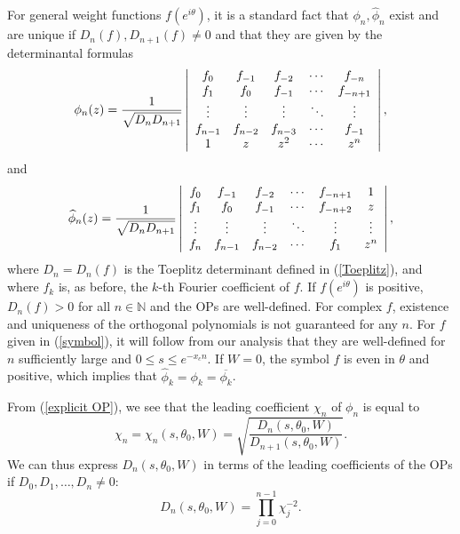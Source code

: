 \documentclass[11pt,fleqn]{article}
\numberwithin{equation}{section}
\begin{document}
For general weight functions $f(e^{i\theta})$, it is a standard fact that $\phi_n,\widehat\phi_n$ exist and are unique if $D_n(f), D_{n+1}(f)\neq 0$ and that they are given by the determinantal formulas \cite{Simon}
\begin{equation} \label{explicit OP}
\phi_{n}(z) = \frac{1}{\sqrt{D_{n}D_{n+1}}} \left| \begin{array}{c c c c c}
f_0 & f_{-1} & f_{-2} & \cdots & f_{-n} \\
f_{1} & f_{0} & f_{-1} & \cdots & f_{-n+1} \\
\vdots & \vdots & \vdots & \ddots & \vdots \\
f_{n-1} & f_{n-2} & f_{n-3} & \cdots & f_{-1} \\
1 & z & z^2 & \cdots & z^n
\end{array} \right|,
\end{equation}
and
\begin{equation} \label{explicit OP2}
\widehat\phi_{n}(z) = \frac{1}{\sqrt{D_{n}D_{n+1}}} \left| \begin{array}{c c c c c c}
f_0 & f_{-1} & f_{-2} & \cdots & f_{-n+1} &1\\
f_{1} & f_{0} & f_{-1} & \cdots & f_{-n+2}& z\\
\vdots & \vdots & \vdots & \ddots & \vdots& \vdots\\
f_{n} & f_{n-1} & f_{n-2} & \cdots & f_{1}& z^{n}
\end{array} \right|,
\end{equation}
where $D_n=D_n(f)$ is the Toeplitz determinant defined in (\ref{Toeplitz}), and where $f_k$ is, as before, the $k$-th Fourier coefficient of $f$.
If $f(e^{i\theta})$ is  positive, $D_n(f)>0$ for all $n\in\mathbb N$ and the OPs are well-defined. 
For complex $f$, existence and uniqueness of the orthogonal polynomials is not guaranteed for any $n$.
For $f$ given in (\ref{symbol}), it will follow from our analysis that they are well-defined for $n$ sufficiently large and $0\leq s\leq e^{-x_cn}$.
If $W=0$, the symbol $f$ is even in $\theta$ and positive, which implies that $\widehat\phi_k=\phi_{k} = \overline{\phi_{k}}$.





From (\ref{explicit OP}), we see that the leading coefficient $\chi_n$ of $\phi_n$ is equal to
\begin{equation*}
\chi_n = \chi_n(s,\theta_0,W) = \sqrt{\frac{D_{n}(s,\theta_0,W)}{D_{n+1}(s,\theta_0,W)}}.
\end{equation*}
We can thus express $D_n(s,\theta_0,W)$ in terms of the leading coefficients of the OPs if $D_0, D_1, \ldots, D_n\neq 0$:
\begin{equation}\label{Toeplit_express_by_chi_n}
D_{n}(s,\theta_0,W) = \prod_{j=0}^{n-1} \chi_{j}^{-2}.
\end{equation}
\end{document}
